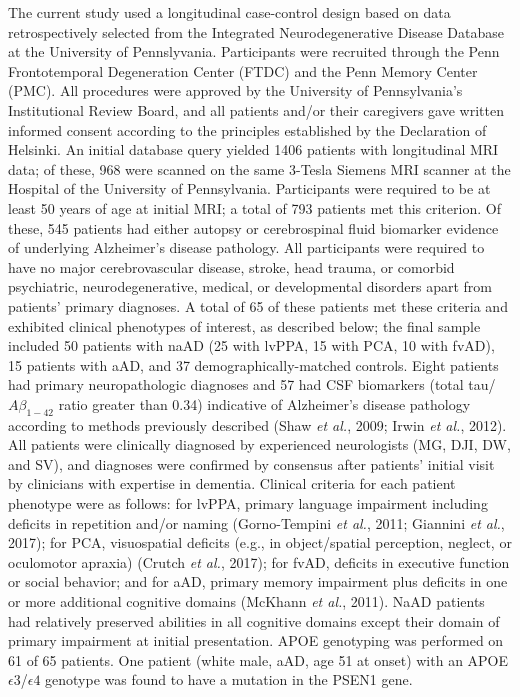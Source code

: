 \documentclass[]{article}
\begin{document}
The current study used a longitudinal case-control design based on data
retrospectively selected from the Integrated Neurodegenerative Disease
Database at the University of Pennslyvania. Participants were recruited
through the Penn Frontotemporal Degeneration Center (FTDC) and the Penn
Memory Center (PMC). All procedures were approved by the University of
Pennsylvania's Institutional Review Board, and all patients and/or their
caregivers gave written informed consent according to the principles
established by the Declaration of Helsinki. An initial database query
yielded 1406 patients with longitudinal MRI data; of these, 968 were
scanned on the same 3-Tesla Siemens MRI scanner at the Hospital of the
University of Pennsylvania. Participants were required to be at least 50
years of age at initial MRI; a total of 793 patients met this criterion.
Of these, 545 patients had either autopsy or cerebrospinal fluid
biomarker evidence of underlying Alzheimer's disease pathology. All
participants were required to have no major cerebrovascular disease,
stroke, head trauma, or comorbid psychiatric, neurodegenerative,
medical, or developmental disorders apart from patients' primary
diagnoses. A total of 65 of these patients met these criteria and
exhibited clinical phenotypes of interest, as described below; the final
sample included 50 patients with naAD (25 with lvPPA, 15 with PCA, 10
with fvAD), 15 patients with aAD, and 37 demographically-matched
controls. Eight patients had primary neuropathologic diagnoses and 57
had CSF biomarkers (total tau/\(A\beta_{1-42}\) ratio greater than 0.34)
indicative of Alzheimer's disease pathology according to methods
previously described (Shaw \emph{et al.}, 2009; Irwin \emph{et al.},
2012). All patients were clinically diagnosed by experienced
neurologists (MG, DJI, DW, and SV), and diagnoses were confirmed by
consensus after patients' initial visit by clinicians with expertise in
dementia. Clinical criteria for each patient phenotype were as follows:
for lvPPA, primary language impairment including deficits in repetition
and/or naming (Gorno-Tempini \emph{et al.}, 2011; Giannini \emph{et
al.}, 2017); for PCA, visuospatial deficits (e.g., in object/spatial
perception, neglect, or oculomotor apraxia) (Crutch \emph{et al.},
2017); for fvAD, deficits in executive function or social behavior; and
for aAD, primary memory impairment plus deficits in one or more
additional cognitive domains (McKhann \emph{et al.}, 2011). NaAD
patients had relatively preserved abilities in all cognitive domains
except their domain of primary impairment at initial presentation. APOE
genotyping was performed on 61 of 65 patients. One patient (white male,
aAD, age 51 at onset) with an APOE \(\epsilon3\)/\(\epsilon4\) genotype
was found to have a mutation in the PSEN1 gene.
\end{document}
